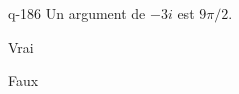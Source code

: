 \begin{truefalse}{q-186}
Un argument de $-3i$ est $9\pi/2$.
\item Vrai
\item* Faux
\end{truefalse}

